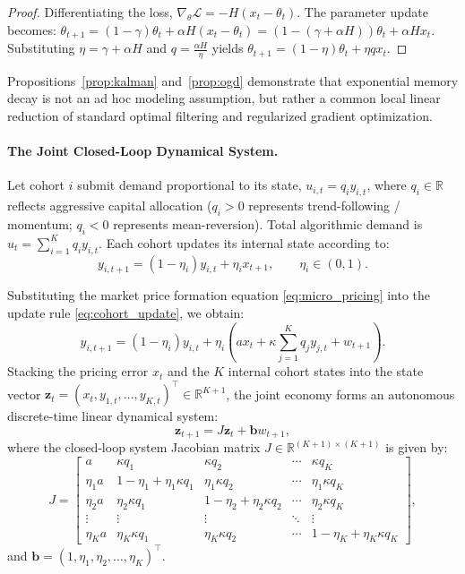 \documentclass[12pt]{article}
\theoremstyle{definition}
\theoremstyle{remark}
\newcommand{\R}{\mathbb{R}}
\begin{document}
\begin{proof}
Differentiating the loss, $\nabla_\theta \mathcal{L} = -H(x_t - \theta_t)$. The parameter update becomes:
$\theta_{t+1} = (1 - \gamma)\theta_t + \alpha H (x_t - \theta_t) = (1 - (\gamma + \alpha H))\theta_t + \alpha H x_t$.
Substituting $\eta = \gamma + \alpha H$ and $q = \frac{\alpha H}{\eta}$ yields $\theta_{t+1} = (1 - \eta)\theta_t + \eta q x_t$.
\end{proof}

Propositions~\ref{prop:kalman} and~\ref{prop:ogd} demonstrate that exponential memory decay is not an ad hoc modeling assumption, but rather a common local linear reduction of standard optimal filtering and regularized gradient optimization.

\paragraph{The Joint Closed-Loop Dynamical System.}
Let cohort $i$ submit demand proportional to its state, $u_{i,t} = q_i y_{i,t}$, where $q_i \in \R$ reflects aggressive capital allocation ($q_i > 0$ represents trend-following / momentum; $q_i < 0$ represents mean-reversion). Total algorithmic demand is $u_t = \sum_{i=1}^K q_i y_{i,t}$. Each cohort updates its internal state according to:
\begin{equation}
y_{i, t+1} = (1 - \eta_i) y_{i, t} + \eta_i x_{t+1}, \qquad \eta_i \in (0, 1).
\label{eq:cohort_update}
\end{equation}

Substituting the market price formation equation \eqref{eq:micro_pricing} into the update rule \eqref{eq:cohort_update}, we obtain:
\begin{equation}
y_{i, t+1} = (1 - \eta_i) y_{i, t} + \eta_i \left( a x_t + \kappa \sum_{j=1}^K q_j y_{j, t} + w_{t+1} \right).
\end{equation}
Stacking the pricing error $x_t$ and the $K$ internal cohort states into the state vector $\mathbf{z}_t = (x_t, y_{1,t}, \dots, y_{K,t})^\top \in \R^{K+1}$, the joint economy forms an autonomous discrete-time linear dynamical system:
\begin{equation}
\mathbf{z}_{t+1} = J \mathbf{z}_t + \mathbf{b} w_{t+1},
\label{eq:state_space_system}
\end{equation}
where the closed-loop system Jacobian matrix $J \in \R^{(K+1) \times (K+1)}$ is given by:
\begin{equation}
J = \begin{bmatrix}
a & \kappa q_1 & \kappa q_2 & \cdots & \kappa q_K \\
\eta_1 a & 1 - \eta_1 + \eta_1 \kappa q_1 & \eta_1 \kappa q_2 & \cdots & \eta_1 \kappa q_K \\
\eta_2 a & \eta_2 \kappa q_1 & 1 - \eta_2 + \eta_2 \kappa q_2 & \cdots & \eta_2 \kappa q_K \\
\vdots & \vdots & \vdots & \ddots & \vdots \\
\eta_K a & \eta_K \kappa q_1 & \eta_K \kappa q_2 & \cdots & 1 - \eta_K + \eta_K \kappa q_K
\end{bmatrix},
\label{eq:full_jacobian}
\end{equation}
and $\mathbf{b} = (1, \eta_1, \eta_2, \dots, \eta_K)^\top$.
\end{document}
